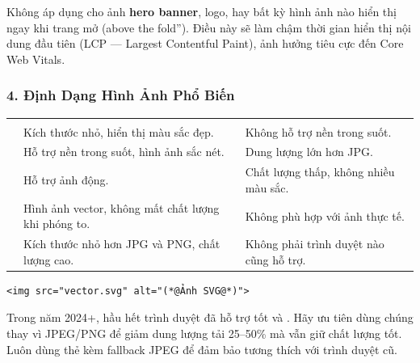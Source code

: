 \begin{warnBox}[Không Dùng loading="lazy" Cho Ảnh Quan Trọng Đầu Trang]
Không áp dụng  cho ảnh \textbf{hero banner}, logo, hay bất kỳ hình ảnh nào hiển thị ngay khi trang mở (\codeinline{}above the fold''). Điều này sẽ làm chậm thời gian hiển thị nội dung đầu tiên (LCP — Largest Contentful Paint), ảnh hưởng tiêu cực đến Core Web Vitals.
\end{warnBox}

\subsubsection{4. Định Dạng Hình Ảnh Phổ Biến}

\begin{prettyTableBox}
\begin{tabularx}{\linewidth}{C{2.2cm} L{5cm} Z}
 &  &  \\
 & Kích thước nhỏ, hiển thị màu sắc đẹp. & Không hỗ trợ nền trong suốt. \\
 & Hỗ trợ nền trong suốt, hình ảnh sắc nét. & Dung lượng lớn hơn JPG. \\
 & Hỗ trợ ảnh động. & Chất lượng thấp, không nhiều màu sắc. \\
 & Hình ảnh vector, không mất chất lượng khi phóng to. & Không phù hợp với ảnh thực tế. \\
 & Kích thước nhỏ hơn JPG và PNG, chất lượng cao. & Không phải trình duyệt nào cũng hỗ trợ. \\
\end{tabularx}
\end{prettyTableBox}

\begin{codeWindow}
\begin{lstlisting}[language=HTML5]
<img src="vector.svg" alt="(*@Ảnh SVG@*)">
\end{lstlisting}
\end{codeWindow}

\begin{tipBox}
Trong năm 2024+, hầu hết trình duyệt đã hỗ trợ tốt  và . Hãy ưu tiên dùng chúng thay vì JPEG/PNG để giảm dung lượng tải 25--50\% mà vẫn giữ chất lượng tốt. Luôn dùng thẻ  kèm fallback JPEG để đảm bảo tương thích với trình duyệt cũ.
\end{tipBox}

